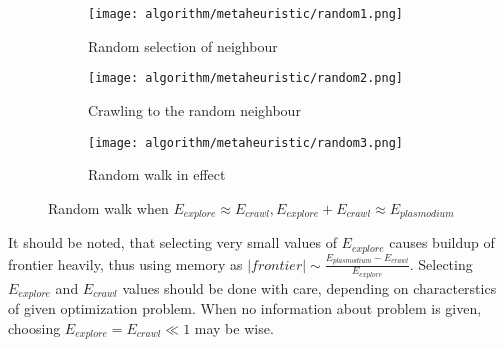 \begin{figure}
  \centering

  \begin{subfigure}{0.3\textwidth}
    \centering
    \texttt{[image: algorithm/metaheuristic/random1.png]}
    \caption{Random selection of neighbour}
  \end{subfigure}
  \begin{subfigure}{0.3\textwidth}
    \centering
    \texttt{[image: algorithm/metaheuristic/random2.png]}
    \caption{Crawling to the random neighbour}
  \end{subfigure}
  \begin{subfigure}{0.3\textwidth}
    \centering
    \texttt{[image: algorithm/metaheuristic/random3.png]}
    \caption{Random walk in effect}
  \end{subfigure}

  \caption{Random walk when $E_{explore} \approx E_{crawl}, E_{explore} + E_{crawl} \approx E_{plasmodium}$}
  \label{figure:m_explore_special}
\end{figure}

It should be noted, that selecting very small values of $E_{explore}$ causes buildup of frontier heavily, thus using memory as $|frontier| \sim \frac{E_{plasmodium} - E_{crawl}}{E_{explore}}$. Selecting $E_{explore}$ and $E_{crawl}$ values should be done with care, depending on characterstics of given optimization problem. When no information about problem is given, choosing $E_{explore} = E_{crawl} \ll 1$ may be wise. 

